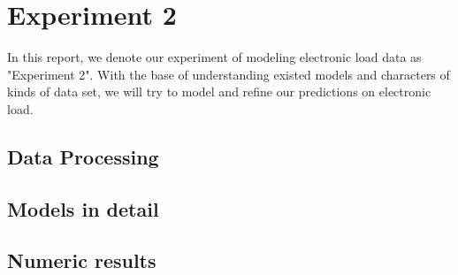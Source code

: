 
\chapter{Experiment 2} %

\label{Chapter4} %


In this report, we denote our experiment of modeling electronic load data as "Experiment 2". With the base of understanding existed models and characters of kinds of data set, we will try to model and refine our predictions on electronic load.

\section{Data Processing}

\section{Models in detail}

\section{Numeric results}

